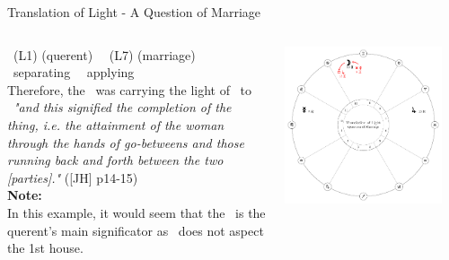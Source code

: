 \begin{frame}[t]{Translation of Light  - A Question of Marriage}
\begin{columns}[T, onlytextwidth]
\Mercury\ (L1) (querent) \Quincunx\ \Jupiter\ (L7) (marriage) \\
\Moon\ separating \Sextile\ \Mercury\ applying \Square\ \Jupiter \\
\vspace{0.25cm}
Therefore, the \Moon\ was carrying the light of \Mercury\ to \Jupiter\ \textsl{"and this signified the completion of the thing, i.e. the attainment of the woman through the hands of go-betweens and those running back and forth between the two [parties]."} ([JH] p14-15) \\
\vspace{0.15cm}
\textbf{Note:} \\
\small
In this example, it would seem that the \Moon\ is  the querent's main significator as \Mercury\ does not aspect the 1st house. \\

\begin{center}
{\includegraphics[width=0.9\textwidth]{charts/60-translation}} \\
\end{center}
\end{columns}
\end{frame}